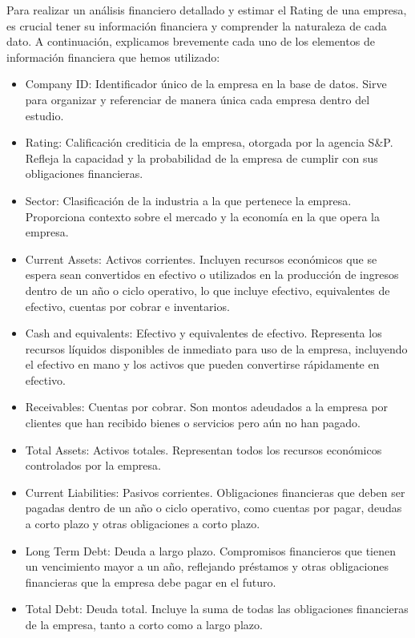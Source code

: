\documentclass{article}
\begin{document}
Para realizar un análisis financiero detallado y estimar el Rating de una empresa, es crucial tener su información financiera y comprender la naturaleza de cada dato. A continuación, explicamos brevemente cada uno de los elementos de información financiera que hemos utilizado: 


\begin{itemize}
    \item Company ID: Identificador único de la empresa en la base de datos. Sirve para organizar y referenciar de manera única cada empresa dentro del estudio.
    \item Rating: Calificación crediticia de la empresa, otorgada por la agencia S\&P. Refleja la capacidad y la probabilidad de la empresa de cumplir con sus obligaciones financieras.
    \item Sector: Clasificación de la industria a la que pertenece la empresa. Proporciona contexto sobre el mercado y la economía en la que opera la empresa.
    \item Current Assets: Activos corrientes. Incluyen recursos económicos que se espera sean convertidos en efectivo o utilizados en la producción de ingresos dentro de un año o ciclo operativo, lo que incluye efectivo, equivalentes de efectivo, cuentas por cobrar e inventarios.
    \item Cash and equivalents: Efectivo y equivalentes de efectivo. Representa los recursos líquidos disponibles de inmediato para uso de la empresa, incluyendo el efectivo en mano y los activos que pueden convertirse rápidamente en efectivo.
    \item Receivables: Cuentas por cobrar. Son montos adeudados a la empresa por clientes que han recibido bienes o servicios pero aún no han pagado.
    \item Total Assets: Activos totales. Representan todos los recursos económicos controlados por la empresa.
    \item Current Liabilities: Pasivos corrientes. Obligaciones financieras que deben ser pagadas dentro de un año o ciclo operativo, como cuentas por pagar, deudas a corto plazo y otras obligaciones a corto plazo.
    \item Long Term Debt: Deuda a largo plazo. Compromisos financieros que tienen un vencimiento mayor a un año, reflejando préstamos y otras obligaciones financieras que la empresa debe pagar en el futuro.
    \item Total Debt: Deuda total. Incluye la suma de todas las obligaciones financieras de la empresa, tanto a corto como a largo plazo.

\end{itemize}
\end{document}
